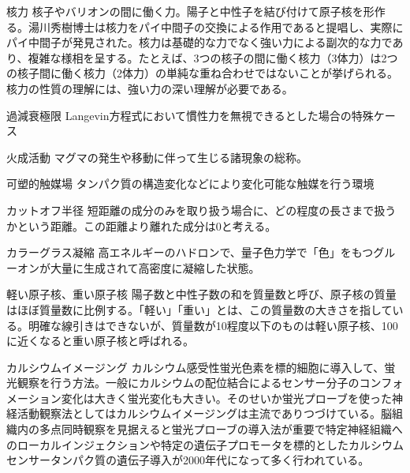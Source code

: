 \begin{用語集}
\item{核力}{}
{核子やバリオンの間に働く力。陽子と中性子を結び付けて原子核を形作る。湯川秀樹博士は核力をパイ中間子の交換による作用であると提唱し、実際にパイ中間子が発見された。核力は基礎的な力でなく強い力による副次的な力であり、複雑な様相を呈する。たとえば、3つの核子の間に働く核力（3体力）は2つの核子間に働く核力（2体力）の単純な重ね合わせではないことが挙げられる。核力の性質の理解には、強い力の深い理解が必要である。}
\item{過減衰極限}{}
{Langevin方程式において慣性力を無視できるとした場合の特殊ケース}
\item{火成活動}{}
{マグマの発生や移動に伴って生じる諸現象の総称。}
\item{可塑的触媒場}{}
{タンパク質の構造変化などにより変化可能な触媒を行う環境}
\item{カットオフ半径}{}
{短距離の成分のみを取り扱う場合に、どの程度の長さまで扱うかという距離。この距離より離れた成分は0と考える。}
\item{カラーグラス凝縮}{}
{高エネルギーのハドロンで、量子色力学で「色」をもつグルーオンが大量に生成されて高密度に凝縮した状態。}
\item{軽い原子核、重い原子核}{}
{陽子数と中性子数の和を質量数と呼び、原子核の質量はほぼ質量数に比例する。「軽い」「重い」とは、この質量数の大きさを指している。明確な線引きはできないが、質量数が10程度以下のものは軽い原子核、100に近くなると重い原子核と呼ばれる。}
\item{カルシウムイメージング}{}
{カルシウム感受性蛍光色素を標的細胞に導入して、蛍光観察を行う方法。一般にカルシウムの配位結合によるセンサー分子のコンフォメーション変化は大きく蛍光変化も大きい。そのせいか蛍光プローブを使った神経活動観察法としてはカルシウムイメージングは主流でありつづけている。脳組織内の多点同時観察を見据えると蛍光プローブの導入法が重要で特定神経組織へのローカルインジェクションや特定の遺伝子プロモータを標的としたカルシウムセンサータンパク質の遺伝子導入が2000年代になって多く行われている。}

\end{用語集}
